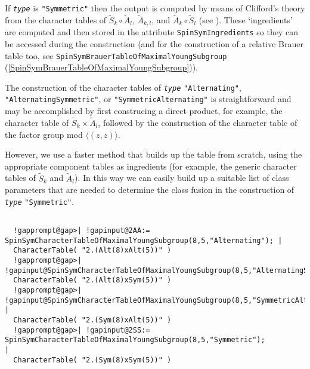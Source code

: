 \documentclass[a4paper,11pt]{report}
\begin{document}
{{{ If \mbox{\texttt{\mdseries\slshape type}} is \texttt{"Symmetric"} then the output is computed by means of Clifford's theory from the character
tables of $\tilde{S}_k\circ\tilde{A}_l$, $\tilde{A}_{k,l}$, and $\tilde{A}_k\circ\tilde{S}_l$ (see \cite[Section 5.2]{Maas2011}). These `ingredients' are computed and then stored in the attribute \texttt{SpinSymIngredients} so they can be accessed during the construction (and for the construction of a
relative Brauer table too, see \texttt{SpinSymBrauerTableOfMaximalYoungSubgroup} (\ref{SpinSymBrauerTableOfMaximalYoungSubgroup})). 

 The construction of the character tables of \mbox{\texttt{\mdseries\slshape type}} \texttt{"Alternating"}, \texttt{"AlternatingSymmetric"}, or \texttt{"SymmetricAlternating"} is straightforward and may be accomplished by first construcing a direct
product, for example, the character table of $\tilde{S}_k\times\tilde{A}_{l}$, followed by the construction of the character table of the factor group mod $\langle(z,z)\rangle$.

 However, we use a faster method that builds up the table from scratch, using
the appropriate component tables as ingredients (for example, the generic
character tables of  $\tilde{S}_k$ and  $\tilde{A}_l$). In this way we can easily build up a suitable list of class parameters that
are needed to determine the class fusion in the construction of \mbox{\texttt{\mdseries\slshape type}} \texttt{"Symmetric"}. }

 
\begin{Verbatim}[commandchars=!@|,fontsize=\small,frame=single,label=Example]
  
  !gapprompt@gap>| !gapinput@2AA:= SpinSymCharacterTableOfMaximalYoungSubgroup(8,5,"Alternating"); |
  CharacterTable( "2.(Alt(8)xAlt(5))" )
  !gapprompt@gap>| !gapinput@SpinSymCharacterTableOfMaximalYoungSubgroup(8,5,"AlternatingSymmetric");|
  CharacterTable( "2.(Alt(8)xSym(5))" )
  !gapprompt@gap>| !gapinput@SpinSymCharacterTableOfMaximalYoungSubgroup(8,5,"SymmetricAlternating");     |
  CharacterTable( "2.(Sym(8)xAlt(5))" )
  !gapprompt@gap>| !gapinput@2SS:= SpinSymCharacterTableOfMaximalYoungSubgroup(8,5,"Symmetric");           |
  CharacterTable( "2.(Sym(8)xSym(5))" )
  
\end{Verbatim}
 

}}
\end{document}
